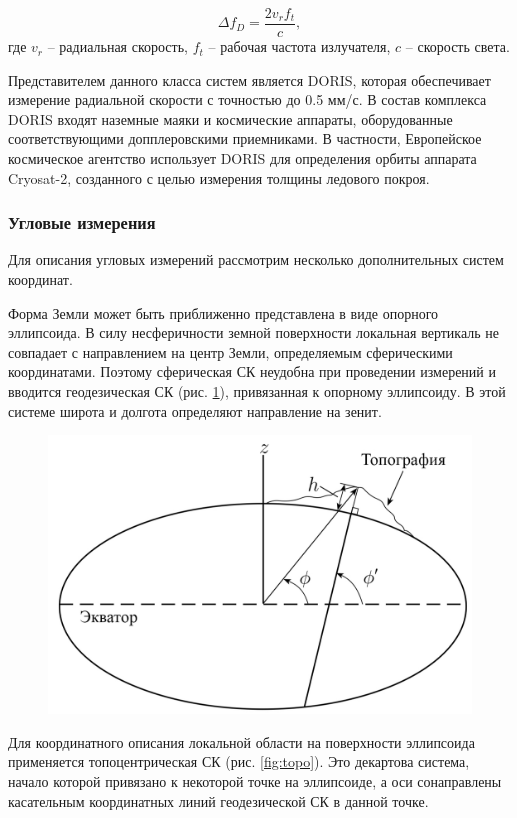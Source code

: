 \begin{equation*}
    \Delta f_D = \frac{2 v_r f_t}{c},
\end{equation*}
где $v_r$ -- радиальная скорость, $f_t$ -- рабочая частота излучателя, $c$ -- скорость света.

Представителем данного класса систем является DORIS,
которая обеспечивает измерение радиальной скорости с точностью до 0.5 мм/с.
В состав комплекса DORIS входят наземные маяки и космические аппараты, 
оборудованные соответствующими допплеровскими приемниками. 
В частности, Европейское космическое агентство 
использует DORIS для определения орбиты аппарата Cryosat-2, 
созданного с целью измерения толщины ледового покроя.

\subsubsection{Угловые измерения}

Для описания угловых измерений рассмотрим несколько дополнительных систем координат.

Форма Земли может быть приближенно представлена в виде опорного эллипсоида.
В силу несферичности земной поверхности локальная вертикаль не совпадает с направлением на центр Земли, определяемым сферическими координатами.
Поэтому сферическая СК неудобна при проведении измерений 
и вводится геодезическая СК (рис. \ref{fig:geodes}), привязанная к опорному эллипсоиду.
В этой системе широта и долгота определяют направление на зенит.

\begin{figure}[h!]
    \centering
    \includegraphics[width=0.5\linewidth]{../images/review/geodes.PNG}
    \label{fig:geodes}
\end{figure}

Для координатного описания локальной области на поверхности эллипсоида
применяется топоцентрическая СК (рис. \ref{fig:topo}). Это декартова система, начало которой привязано к некоторой точке на эллипсоиде,
а оси сонаправлены касательным координатных линий геодезической СК в данной точке.

